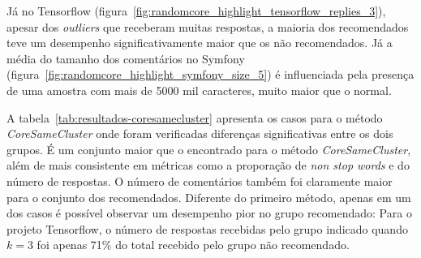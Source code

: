 \documentclass[12pt,openany,oneside,a4paper,english,brazil]{abntbibufjf}
\begin{document}
Já no Tensorflow (figura~\ref{fig:randomcore_highlight_tensorflow_replies_3}), apesar dos \textit{outliers} que receberam muitas respostas, a maioria dos recomendados teve um desempenho significativamente maior que os não recomendados. Já a média do tamanho dos comentários no Symfony (figura~\ref{fig:randomcore_highlight_symfony_size_5}) é influenciada pela presença de uma amostra com mais de 5000 mil caracteres, muito maior que o normal.

A tabela~\ref{tab:resultados-coresamecluster} apresenta os casos para o método \textit{CoreSameCluster} onde foram verificadas diferenças significativas entre os dois grupos. É um conjunto maior que o encontrado para o método \textit{CoreSameCluster}, além de mais consistente em métricas como a proporação de \textit{non stop words} e do número de respostas. O número de comentários também foi claramente maior para o conjunto dos recomendados. Diferente do primeiro método, apenas em um dos casos é possível observar um desempenho pior no grupo recomendado: Para o projeto Tensorflow, o número de respostas recebidas pelo grupo indicado quando $k = 3$ foi apenas 71\% do total recebido pelo grupo não recomendado.
\end{document}
